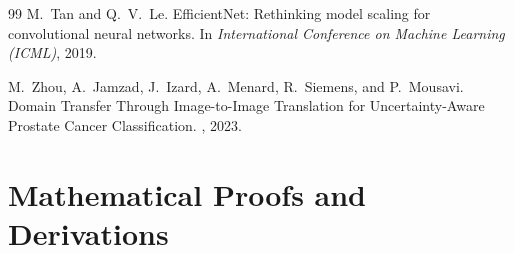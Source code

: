 \documentclass[letterpaper]{article} %
\begin{document}
\begin{thebibliography}{99}
M.~Tan and Q.~V.~Le.
\newblock EfficientNet: Rethinking model scaling for convolutional neural networks.
\newblock In {\em International Conference on Machine Learning (ICML)}, 2019.

M.~Zhou, A.~Jamzad, J.~Izard, A.~Menard, R.~Siemens, and P.~Mousavi.
\newblock Domain Transfer Through Image-to-Image Translation for Uncertainty-Aware Prostate Cancer Classification.
, 2023.

\end{thebibliography}

\appendix
\section{Mathematical Proofs and Derivations}
\end{document}
